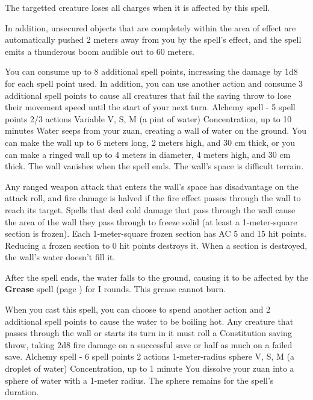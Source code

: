     The targetted creature loses all charges when it is affected by this spell.

    In addition, unsecured objects that are completely within the area of effect are automatically pushed 2 meters away from you by the spell's effect, and the spell emits a thunderous boom audible out to 60 meters.

    You can consume up to 8 additional spell points, increasing the damage by 1d8 for each spell point used.
    In addition, you can use another action and consume 3 additional spell points to cause all creatures that fail the saving throw to lose their movement speed until the start of your next turn.
    {Alchemy spell - 5 spell points}
    {2/3 actions}
    {Variable}
    {V, S, M (a pint of water)}
    {Concentration, up to 10 minutes}
    Water seeps from your zuan, creating a wall of water on the ground.
    You can make the wall up to 6 meters long, 2 meters high, and 30 cm thick, or you can make a ringed wall up to 4 meters in diameter, 4 meters high, and 30 cm thick.
    The wall vanishes when the spell ends.
    The wall's space is difficult terrain.

    Any ranged weapon attack that enters the wall's space has disadvantage on the attack roll, and fire damage is halved if the fire effect passes through the wall to reach its target.
    Spells that deal cold damage that pass through the wall cause the area of the wall they pass through to freeze solid (at least a 1-meter-square section is frozen).
    Each 1-meter-square frozen section has AC 5 and 15 hit points.
    Reducing a frozen section to 0 hit points destroys it.
    When a section is destroyed, the wall's water doesn't fill it.

    After the spell ends, the water falls to the ground, causing it to be affected by the \textbf{Grease} spell (page \pageref{spell::grease}) for I rounds.
    This grease cannot burn.

    When you cast this spell, you can choose to spend another action and 2 additional spell points to cause the water to be boiling hot.
    Any creature that passes through the wall or starts its turn in it must roll a Constitution saving throw, taking 2d8 fire damage on a successful save or half as much on a failed save.
    {Alchemy spell - 6 spell points}
    {2 actions}
    {1-meter-radius sphere}
    {V, S, M (a droplet of water)}
    {Concentration, up to 1 minute}
    You dissolve your zuan into a sphere of water with a 1-meter radius.
    The sphere remains for the spell's duration.

